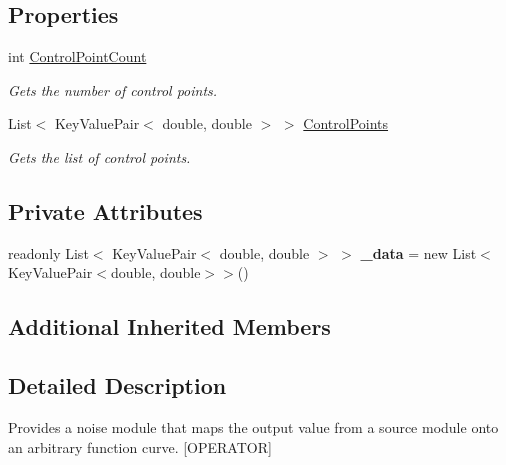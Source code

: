\subsection*{Properties}
\begin{DoxyCompactItemize}
\item 
int \hyperlink{class_lib_noise_1_1_operator_1_1_curve_aef2a1ba86aa32e084016a68a69ccbf77}{Control\+Point\+Count}
\begin{DoxyCompactList}\small\item\em Gets the number of control points. \end{DoxyCompactList}\item 
List$<$ Key\+Value\+Pair$<$ double, double $>$ $>$ \hyperlink{class_lib_noise_1_1_operator_1_1_curve_a2305c68faee6abf84bbc572ef0da509b}{Control\+Points}
\begin{DoxyCompactList}\small\item\em Gets the list of control points. \end{DoxyCompactList}\end{DoxyCompactItemize}
\subsection*{Private Attributes}
\begin{DoxyCompactItemize}
\item 
\mbox{\label{class_lib_noise_1_1_operator_1_1_curve_a6649411136c83b617c31f608a0558c37}} 
readonly List$<$ Key\+Value\+Pair$<$ double, double $>$ $>$ {\bfseries \+\_\+data} = new List$<$Key\+Value\+Pair$<$double, double$>$$>$()
\end{DoxyCompactItemize}
\subsection*{Additional Inherited Members}


\subsection{Detailed Description}
Provides a noise module that maps the output value from a source module onto an arbitrary function curve. \mbox{[}O\+P\+E\+R\+A\+T\+OR\mbox{]} 



